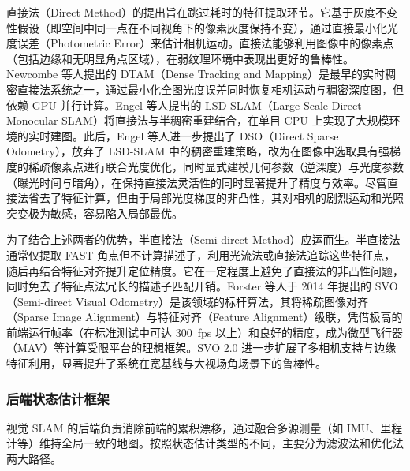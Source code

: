 直接法（Direct Method）的提出旨在跳过耗时的特征提取环节。它基于灰度不变性假设（即空间中同一点在不同视角下的像素灰度保持不变），通过直接最小化光度误差（Photometric Error）来估计相机运动。直接法能够利用图像中的像素点（包括边缘和无明显角点区域），在弱纹理环境中表现出更好的鲁棒性。Newcombe 等人\cite{newcombe2011dtam}提出的 DTAM（Dense Tracking and Mapping）是最早的实时稠密直接法系统之一，通过最小化全图光度误差同时恢复相机运动与稠密深度图，但依赖 GPU 并行计算。Engel 等人\cite{engel2014lsd}提出的 LSD-SLAM（Large-Scale Direct Monocular SLAM）将直接法与半稠密重建结合，在单目 CPU 上实现了大规模环境的实时建图。此后，Engel 等人\cite{engel2017direct}进一步提出了 DSO（Direct Sparse Odometry），放弃了 LSD-SLAM 中的稠密重建策略，改为在图像中选取具有强梯度的稀疏像素点进行联合光度优化，同时显式建模几何参数（逆深度）与光度参数（曝光时间与暗角），在保持直接法灵活性的同时显著提升了精度与效率。尽管直接法省去了特征计算，但由于局部光度梯度的非凸性，其对相机的剧烈运动和光照突变极为敏感，容易陷入局部最优。

为了结合上述两者的优势，半直接法（Semi-direct Method）应运而生。半直接法通常仅提取 FAST 角点但不计算描述子，利用光流法或直接法追踪这些特征点，随后再结合特征对齐提升定位精度。它在一定程度上避免了直接法的非凸性问题，同时免去了特征点法冗长的描述子匹配开销。Forster 等人\cite{forster2014svo}于 2014 年提出的 SVO（Semi-direct Visual Odometry）是该领域的标杆算法，其将稀疏图像对齐（Sparse Image Alignment）与特征对齐（Feature Alignment）级联，凭借极高的前端运行帧率（在标准测试中可达 300~fps 以上）和良好的精度，成为微型飞行器（MAV）等计算受限平台的理想框架。SVO 2.0\cite{forster2017svo} 进一步扩展了多相机支持与边缘特征利用，显著提升了系统在宽基线与大视场角场景下的鲁棒性。

\subsubsection{后端状态估计框架}

视觉 SLAM 的后端负责消除前端的累积漂移，通过融合多源测量（如 IMU、里程计等）维持全局一致的地图。按照状态估计类型的不同，主要分为滤波法和优化法两大路径。

